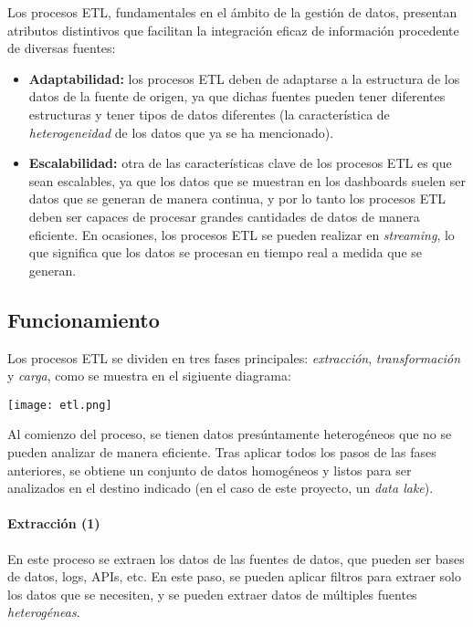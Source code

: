 Los procesos ETL, fundamentales en el ámbito de la gestión de datos, presentan atributos
distintivos que facilitan la integración eficaz de información procedente de diversas fuentes:

\begin{itemize}
	\item \textbf{Adaptabilidad:} los procesos ETL deben de adaptarse a la estructura de los
		datos de la fuente de origen, ya que dichas fuentes pueden tener diferentes estructuras
		y tener tipos de datos diferentes (la característica de \textit{heterogeneidad} de los
		datos que ya se ha mencionado).
	\item \textbf{Escalabilidad:} otra de las características clave de los procesos ETL es que sean
		escalables, ya que los datos que se muestran en los dashboards suelen ser datos que se generan
		de manera continua, y por lo tanto los procesos ETL deben ser capaces de procesar grandes
		cantidades de datos de manera eficiente. En ocasiones, los procesos ETL se pueden realizar en
		\textit{streaming}, lo que significa que los datos se procesan en tiempo real a medida que se
		generan.
\end{itemize}

\newpage{}
\subsection{Funcionamiento}
Los procesos ETL se dividen en tres fases principales: \textit{extracción}, \textit{transformación}
y \textit{carga}, como se muestra en el sigiuente diagrama:

\begin{minipage}{\linewidth}
	\centering
	\texttt{[image: etl.png]}
\end{minipage}

Al comienzo del proceso, se tienen datos presúntamente heterogéneos que no se pueden analizar de
manera eficiente. Tras aplicar todos los pasos de las fases anteriores, se obtiene un conjunto de
datos homogéneos y listos para ser analizados en el destino indicado (en el caso de este proyecto,
un \emph{data lake}).

\paragraph{Extracción (1)}
En este proceso se extraen los datos de las fuentes de datos, que pueden ser bases de datos, logs,
APIs, etc. En este paso, se pueden aplicar filtros para extraer solo los datos que se necesiten, y
se pueden extraer datos de múltiples fuentes \emph{heterogéneas}.

